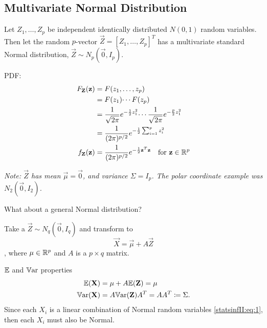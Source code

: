 \documentclass[10pt, a4paper]{article}
\begin{document}
\subsection{Multivariate Normal Distribution}

\begin{definition}
    Let $Z_1, \dotsc, Z_p$ be independent identically distributed $N(0, 1)$ random variables.
    Then let the random $p$-vector $\vec{Z} = [Z_1, \dotsc, Z_p] ^ T$ has a multivariate standard Normal distribution,
    $\vec{Z} \sim N_p(\vec{0}, I_p)$.

    PDF:
    \begin{align*}
        F_{\mathbf{Z}}(\mathbf{z}) &= F(z_1, \dotsc, z_p) \\
        &= F(z_1)\dotsi F(z_p) \\
        &= \frac{1}{\sqrt{2\pi}}e ^ {-\frac{1}{2}z_1 ^ 2}\dotsi\frac{1}{\sqrt{2\pi}}e ^ {-\frac{p}{2}z_1 ^ 2} \\
        &= \frac{1}{(2\pi) ^ {p / 2}}e ^ {-\frac{1}{2}\sum_{i = 1}^{p}z_i ^ 2} \\
        f_{\mathbf{Z}}(\mathbf{z}) &= \frac{1}{(2\pi) ^ {p / 2}}e ^ {-\frac{1}{2}\mathbf{z} ^ T\mathbf{z}}\quad\text{for }\mathbf{z} \in \mathbb{R} ^ p
    \end{align*}
\end{definition}

\textit{Note:
$\vec{Z}$ has mean $\vec{\mu} = \vec{0}$,
and variance $\Sigma = I_p$.
The polar coordinate example was $N_2(\vec{0}, I_2)$.}

What about a general Normal distribution?

Take a $\vec{Z} \sim N_q(\vec{0}, I_q)$ and transform to
\begin{equation}\tag{*}\label{statsinfII:eq:1}
    \vec{X} = \vec{\mu} + A\vec{Z}
\end{equation},
where $\mathbf{\mu} \in \mathbb{R} ^ p$ and $A$ is a $p \times q$ matrix.

$\mathbb{E}$ and $\mathbb{V}\mathrm{ar}$ properties
\begin{align*}
    \mathbb{E}(\mathbf{X}) &= \mathbf{\mu} + A\mathbb{E}(\mathbf{Z}) = \mathbf{\mu} \\
    \mathbb{V}\mathrm{ar}(\mathbf{X}) &= A\mathbb{V}\mathrm{ar}(\mathbf{Z})A ^ T = AA ^ T \coloneqq \Sigma.
\end{align*}
Since each $X_i$ is a linear combination of Normal random variables \eqref{statsinfII:eq:1},
then each $X_i$ must also be Normal.
\end{document}
